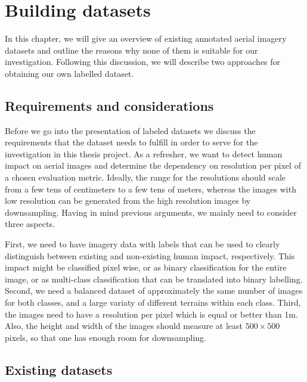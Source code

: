 
\chapter{Building datasets} %

\label{Chapter2} %


In this chapter, we will give an overview of existing annotated aerial imagery datasets and outline the reasons why none of them is suitable for our investigation. Following this discussion, we will describe two approaches for obtaining our own labelled dataset.

\section{Requirements and considerations}

Before we go into the presentation of labeled datasets we discuss the requirements that the dataset needs to fulfill in order to serve for the investigation in this thesis project. As a refresher, we want to detect human impact on aerial images and determine the dependency on resolution per pixel of a chosen evaluation metric. Ideally, the range for the resolutions should scale from a few tens of centimeters to a few tens of meters, whereas the images with low resolution can be generated from the high resolution images by downsampling. Having in mind previous arguments, we mainly need to consider three aspects. 

First, we need to have imagery data with labels that can be used to clearly distinguish between existing and non-existing human impact, respectively. This impact might be classified pixel wise, or as binary classification for the entire image, or as multi-class classification that can be translated into binary labelling. Second, we need a balanced dataset of approximately the same number of images for both classes, and a large variaty of different terrains within each class. Third, the images need to have a resolution per pixel which is equal or better than 1m. Also, the height and width of the images should measure at least $500\times500$ pixels, so that one has enough room for downsampling. 

\section{Existing datasets}


